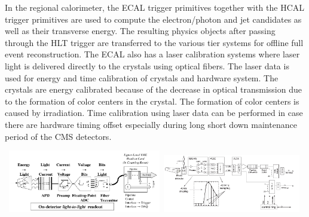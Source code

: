 In the regional calorimeter, the ECAL trigger primitives together with the HCAL trigger primitives are used to  compute the electron/photon and jet candidates as well as their transverse energy. The resulting physics objects after passing through the HLT trigger are transferred to the various tier systems for offline full event reconstruction. The ECAL also has a laser calibration systems where laser light is delivered directly to the \pb crystals using optical fibers. The laser data is used for energy and time calibration of crystals and hardware system. The crystals are energy calibrated because of the decrease in optical transmission due to the formation of color centers in the crystal. The formation of color centers is caused by irradiation. Time calibration using laser data can be performed in case there are hardware timing offset especially during long short down maintenance period of the CMS detectors.
\begin{center}
\centering
\mbox{
\includegraphics[height=0.5\textwidth, width=0.50\textwidth]{THESISPLOTS/CMS-ECAL-READOUT-CHAIN.png} \quad
\includegraphics[height=0.5\textwidth, width=0.450\textwidth]{THESISPLOTS/ReadOut.png}
} 
\label{fig:readout}
\end{center}
